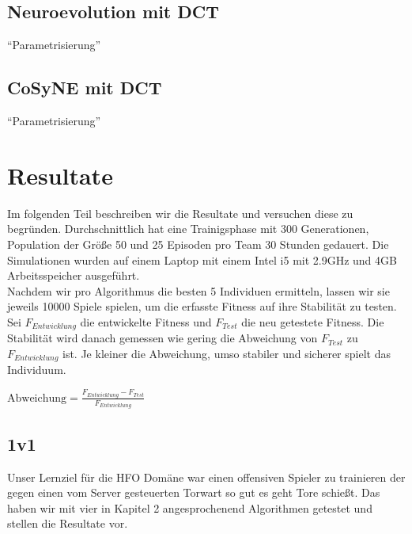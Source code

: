         \subsection{Neuroevolution mit DCT}
            ``Parametrisierung''
        \subsection{CoSyNE mit DCT}
            ``Parametrisierung''

    \section{Resultate}
        Im folgenden Teil beschreiben wir die Resultate und versuchen diese zu begründen. Durchschnittlich hat eine Trainigsphase mit 300 Generationen, Population der Größe 50 und 25 Episoden pro Team 30 Stunden gedauert. Die Simulationen wurden auf einem Laptop mit einem Intel i5 mit 2.9GHz und 4GB Arbeitsspeicher ausgeführt.\\[2mm]
        \noindent
        Nachdem wir pro Algorithmus die besten 5 Individuen ermitteln, lassen wir sie jeweils 10000 Spiele spielen, um die erfasste Fitness auf ihre Stabilität zu testen. \\[2mm]
        \noindent
        Sei $F_{Entwicklung}$ die entwickelte Fitness und $F_{Test}$ die neu getestete Fitness. Die Stabilität wird danach gemessen wie gering die Abweichung von $F_{Test}$ zu $F_{Entwicklung}$ ist. Je kleiner die Abweichung, umso stabiler und sicherer spielt das Individuum.\\

        \begin{center}
            \begin{math}
                \text{Abweichung} = \frac{F_{Entwicklung} - F_{Test}}{F_{Entwicklung}}
            \end{math}
        \end{center}

        \subsection{1v1}
            Unser Lernziel für die HFO Domäne war einen offensiven Spieler zu trainieren der gegen einen vom Server gesteuerten Torwart so gut es geht Tore schießt. Das haben wir mit vier in Kapitel 2 angesprochenend Algorithmen getestet und stellen die Resultate vor. 

\newpage
